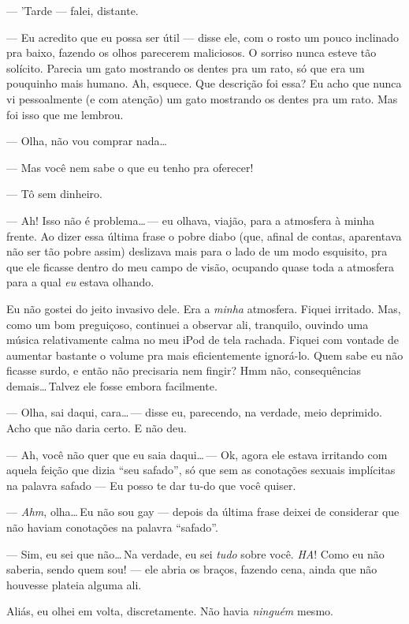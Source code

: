 --- 'Tarde --- falei, distante.

--- Eu acredito que eu possa ser útil --- disse ele, com o rosto um pouco inclinado pra baixo, fazendo os olhos parecerem maliciosos. O sorriso nunca esteve tão solícito. Parecia um gato mostrando os dentes pra um rato, só que era um pouquinho mais humano. Ah, esquece. Que descrição foi essa? Eu acho que nunca vi pessoalmente (e com atenção) um gato mostrando os dentes pra um rato. Mas foi isso que me lembrou.

--- Olha, não vou comprar nada\ldots

--- Mas você nem sabe o que eu tenho pra oferecer!

--- Tô sem dinheiro.

--- Ah! Isso não é problema\ldots\,--- eu olhava, viajão, para a atmosfera à minha frente. Ao dizer essa última frase o pobre diabo (que, afinal de contas, aparentava não ser tão pobre assim) deslizava mais para o lado de um modo esquisito, pra que ele ficasse dentro do meu campo de visão, ocupando quase toda a atmosfera para a qual \emph{eu} estava olhando.

Eu não gostei do jeito invasivo dele. Era a \emph{minha} atmosfera. Fiquei irritado. Mas, como um bom preguiçoso, continuei a observar ali, tranquilo, ouvindo uma música relativamente calma no meu iPod de tela rachada. Fiquei com vontade de aumentar bastante o volume pra mais eficientemente ignorá-lo. Quem sabe eu não ficasse surdo, e então não precisaria nem fingir? Hmm não, consequências demais\ldots\,Talvez ele fosse embora facilmente.

--- Olha, sai daqui, cara\ldots\,--- disse eu, parecendo, na verdade, meio deprimido. Acho que não daria certo. E não deu.

--- Ah, você não quer que eu saia daqui\ldots\,--- Ok, agora ele estava irritando com aquela feição que dizia ``seu safado'', só que sem as conotações sexuais implícitas na palavra safado --- Eu posso te dar tu-do que você quiser.

--- \emph{Ahm}, olha\ldots\,Eu não sou gay --- depois da última frase deixei de considerar que não haviam conotações na palavra ``safado''.

--- Sim, eu sei que não\ldots\,Na verdade, eu sei \emph{tudo} sobre você. \emph{HA}! Como eu não saberia, sendo quem sou! --- ele abria os braços, fazendo cena, ainda que não houvesse plateia alguma ali.

\begin{sloppypar}
Aliás, eu olhei em volta, discretamente. Não havia \emph{ninguém} mesmo.
\end{sloppypar}


